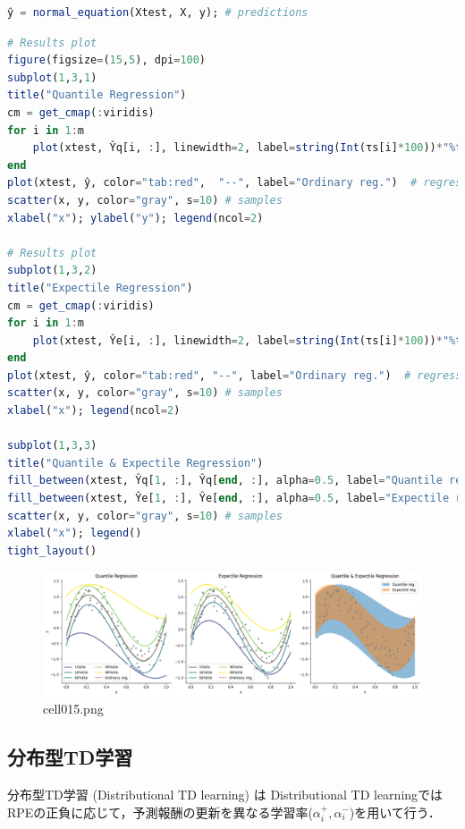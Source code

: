 \begin{lstlisting}[language=julia]
ŷ = normal_equation(Xtest, X, y); # predictions
\end{lstlisting}
\begin{lstlisting}[language=julia]
# Results plot
figure(figsize=(15,5), dpi=100)
subplot(1,3,1)
title("Quantile Regression")
cm = get_cmap(:viridis)
for i in 1:m
    plot(xtest, Ŷq[i, :], linewidth=2, label=string(Int(τs[i]*100))*"%tile", color=cm(i/m)) # regression line
end
plot(xtest, ŷ, color="tab:red",  "--", label="Ordinary reg.")  # regression line
scatter(x, y, color="gray", s=10) # samples
xlabel("x"); ylabel("y"); legend(ncol=2)

# Results plot
subplot(1,3,2)
title("Expectile Regression")
cm = get_cmap(:viridis)
for i in 1:m
    plot(xtest, Ŷe[i, :], linewidth=2, label=string(Int(τs[i]*100))*"%tile", color=cm(i/m)) # regression line
end
plot(xtest, ŷ, color="tab:red", "--", label="Ordinary reg.")  # regression line
scatter(x, y, color="gray", s=10) # samples
xlabel("x"); legend(ncol=2)

subplot(1,3,3)
title("Quantile & Expectile Regression")
fill_between(xtest, Ŷq[1, :], Ŷq[end, :], alpha=0.5, label="Quantile reg.")
fill_between(xtest, Ŷe[1, :], Ŷe[end, :], alpha=0.5, label="Expectile reg.")
scatter(x, y, color="gray", s=10) # samples
xlabel("x"); legend()
tight_layout()
\end{lstlisting}
\begin{figure}[ht]
	\centering
	\includegraphics[scale=0.8, max width=\linewidth]{./fig/bayesian-brain/quantile-expectile-regression/cell015.png}
	\caption{cell015.png}
	\label{cell015.png}
\end{figure}
\subsection{分布型TD学習}
分布型TD学習 (Distributional TD learning) は
Distributional TD learningではRPEの正負に応じて，予測報酬の更新を異なる学習率($\alpha_{i}^{+}, \alpha_{i}^{-}$)を用いて行う． 
 
